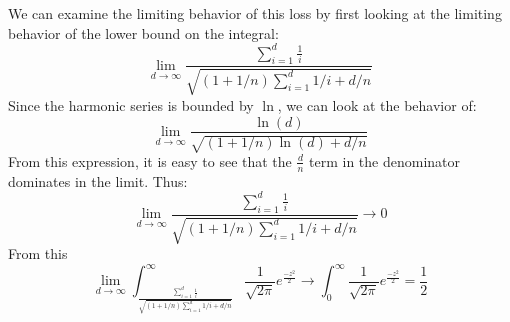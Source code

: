 \documentclass{article}
\begin{document}
  We can examine the limiting behavior of this loss by first looking at the limiting behavior of the lower bound on the integral:
  $$\lim_{d \rightarrow \infty} \frac{\sum_{i=1}^d \frac{1}{i}}{\sqrt{(1+1/n)\sum_{i=1}^d 1/i + d/n}}$$
  Since the harmonic series is bounded by $\ln$, we can look at the behavior of:
  $$\lim_{d \rightarrow \infty} \frac{\ln(d)}{\sqrt{(1+1/n)\ln(d) + d/n}}$$
  From this expression, it is easy to see that the $\frac{d}{n}$ term in the denominator dominates in the limit. Thus:
  $$\lim_{d \rightarrow \infty} \frac{\sum_{i=1}^d \frac{1}{i}}{\sqrt{(1+1/n)\sum_{i=1}^d 1/i + d/n}} \rightarrow 0$$
  From this
  $$\lim_{d \rightarrow \infty} \int_{ \frac{\sum_{i=1}^d \frac{1}{i}}{\sqrt{(1+1/n)\sum_{i=1}^d 1/i + d/n}}}^{\infty} \frac{1}{\sqrt{2 \pi}}e^{\frac{-z^2}{2}} \rightarrow \int_{0}^{\infty} \frac{1}{\sqrt{2 \pi}}e^{\frac{-z^2}{2}} = \frac{1}{2}$$
\end{document}
